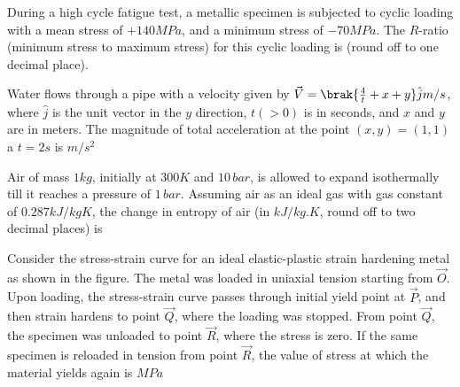     \item During a high cycle fatigue test, a metallic specimen is subjected to cyclic loading with a mean stress of $+140 MPa$, and a minimum stress of $-70 MPa$. The $R$-ratio (minimum stress to maximum stress) for this cyclic loading is \underline{\hspace{1cm}} (round off to one decimal place).

    \item Water flows through a pipe with a velocity given by $\vec{V} = \brak{\frac{4}{t}+x+y}\hat{j}m/s$, where $\hat{j}$ is the unit vector in the $y$ direction, $t (> 0)$ is in seconds, and $x$ and $y$ are in meters. The magnitude of total acceleration at the point $(x, y) = (1, 1)$ a $t = 2 s$ is \underline{\hspace{1cm}} $m/s^2$

    \item Air of mass $1 kg$, initially at $300 K$ and $10\,bar$, is allowed to expand isothermally till it reaches a pressure of $1\,bar$. Assuming air as an ideal gas with gas constant of $0.287 kJ/kg K$, the change in entropy of air (in $kJ/kg.K$, round off to two decimal places) is \underline{\hspace{1cm}}

    \item Consider the stress-strain curve for an ideal elastic-plastic strain hardening metal as shown in the figure. The metal was loaded in uniaxial tension starting from $\vec{O}$. Upon loading, the stress-strain curve passes through initial yield point at $\vec{P}$, and then strain hardens to point $\vec{Q}$, where the loading was stopped. From point $\vec{Q}$, the specimen was unloaded to point $\vec{R}$, where the stress is zero. If the same specimen is reloaded in tension from point $\vec{R}$, the value of stress at which the material yields again is \underline{\hspace{1cm}} $MPa$
        \begin{figure}[!ht]
            \centering
        \end{figure}


